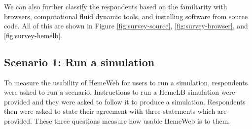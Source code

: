 \noindent%
\begin{minipage}{\linewidth}%
 \label{fig:survey-hemelb}%
\end{minipage}

\vspace{0.5cm}


We can also further classify the respondents based on the familiarity with browsers, computational fluid dynamic tools, and installing software from source code. All of this are shown in Figure \ref{fig:survey-source}, \ref{fig:survey-browser}, and \ref{fig:survey-hemelb}.




\subsection{Scenario 1: Run a simulation}

To measure the usability of HemeWeb for users to run a simulation, respondents were asked to run a  scenario. Instructions to run a HemeLB simulation were provided and they were asked to follow it to produce a simulation. Respondents then were asked to state their agreement with three statements which are provided. These three questions measure how usable HemeWeb is to them. 


\vspace{0.5cm}

